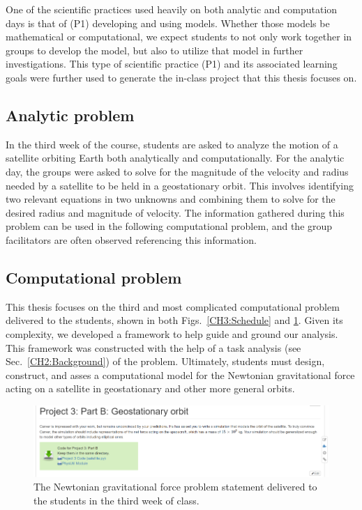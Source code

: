 \documentclass{msuphddissertation}
\begin{document}
\begin{doublespace}
One of the scientific practices used heavily on both analytic and computation days is that of (P1) developing and using models.  Whether those models be mathematical or computational, we expect students to not only work together in groups to develop the model, but also to utilize that model in further investigations.  This type of scientific practice (P1) and its associated learning goals \cite{Irving2017} were further used to generate the in-class project that this thesis focuses on.

\subsection{Analytic problem}

In the third week of the course, students are asked to analyze the motion of a satellite orbiting Earth both analytically and computationally.  For the analytic day, the groups were asked to solve for the magnitude of the velocity and radius needed by a satellite to be held in a geostationary orbit.  This involves identifying two relevant equations in two unknowns and combining them to solve for the desired radius and magnitude of velocity.  The information gathered during this problem can be used in the following computational problem, and the group facilitators are often observed referencing this information.

\subsection{Computational problem}

This thesis focuses on the third and most complicated computational problem delivered to the students, shown in both Figs.~\ref{CH3:Schedule} and \ref{CH3:SatelliteProblem}. Given its complexity, we developed a framework to help guide and ground our analysis.  This framework was constructed with the help of a task analysis (see Sec.~\ref{CH2:Background}) of the problem.  Ultimately, students must design, construct, and asses a computational model for the Newtonian gravitational force acting on a satellite in geostationary and other more general orbits.

\begin{figure}[ht]\centering
\includegraphics[scale=1]{images/CH3SatelliteProblem.pdf}
\caption{The Newtonian gravitational force problem statement delivered to the students in the third week of class.}\label{CH3:SatelliteProblem}
\end{figure}


\end{doublespace}
\end{document}
